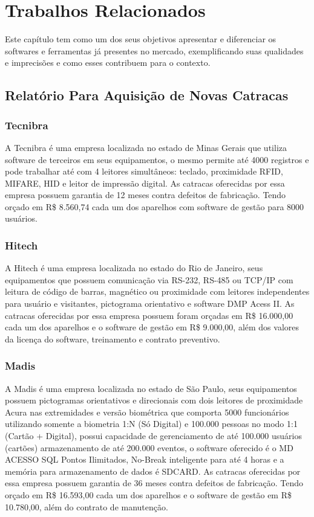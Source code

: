 \section{Trabalhos Relacionados}
Este capítulo tem como um dos seus objetivos apresentar e diferenciar os softwares e ferramentas já presentes no mercado, exemplificando suas qualidades e imprecisões e como esses contribuem para o contexto.

\subsection{Relatório Para Aquisição de Novas Catracas}
\subsubsection{Tecnibra}
A Tecnibra é uma empresa localizada no estado de Minas Gerais que utiliza software de terceiros em seus equipamentos, o mesmo permite até 4000 registros e pode trabalhar até com 4 leitores simultâneos: teclado, proximidade RFID, MIFARE, HID e leitor de impressão digital. As catracas oferecidas por essa empresa possuem garantia de 12 meses contra defeitos de fabricação. Tendo orçado em R\$ 8.560,74 cada um dos aparelhos com software de gestão para 8000 usuários.
\subsubsection{Hitech}
A Hitech é uma empresa localizada no estado do Rio de Janeiro, seus equipamentos que possuem
comunicação via RS-232, RS-485 ou TCP/IP com leitura de código de barras,
magnético ou proximidade com leitores independentes para usuário e visitantes,
pictograma orientativo e software DMP Acess II. As catracas oferecidas por essa empresa possuem foram orçadas em R\$ 16.000,00 cada um dos aparelhos e o software de gestão em R\$ 9.000,00, além dos valores da licença do software, treinamento e contrato preventivo.
\subsubsection{Madis}
A Madis é uma empresa localizada no estado de São Paulo, seus equipamentos possuem pictogramas orientativos e direcionais com dois leitores de
proximidade Acura nas extremidades e versão biométrica que comporta 5000
funcionários utilizando somente a biometria 1:N (Só Digital) e 100.000 pessoas no
modo 1:1 (Cartão + Digital), possui capacidade de gerenciamento de até 100.000
usuários (cartões) armazenamento de até 200.000 eventos, o software oferecido é o
MD ACESSO SQL Pontos Ilimitados, No-Break inteligente para até 4 horas e a
memória para armazenamento de dados é SDCARD. As catracas oferecidas por essa empresa possuem garantia de 36 meses contra defeitos de fabricação. Tendo orçado em R\$ 16.593,00 cada um dos aparelhos e o software de gestão em R\$ 10.780,00, além do contrato de manutenção.

